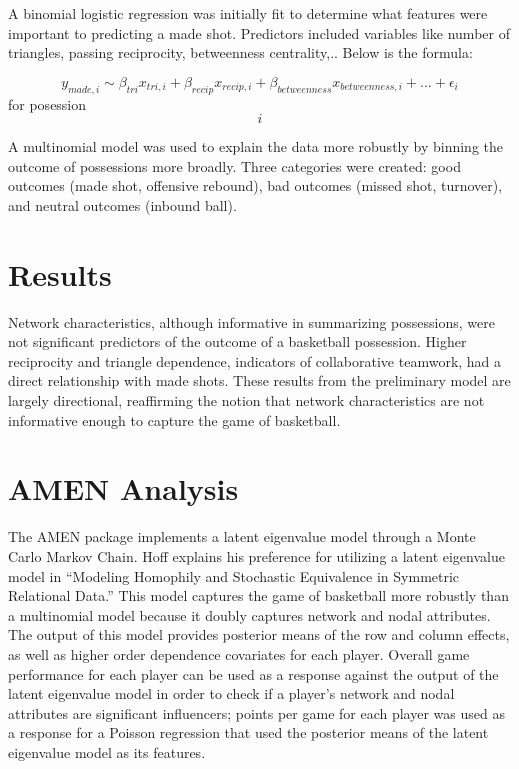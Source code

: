 \documentclass[12pt,twoside]{dukestatscithesis}
\theoremstyle{definition}
\theoremstyle{definition}
\theoremstyle{definition}
\theoremstyle{remark}
\begin{document}
A binomial logistic regression was initially fit to determine what
features were important to predicting a made shot. Predictors included
variables like number of triangles, passing reciprocity, betweenness
centrality,.. Below is the formula:

\[y_{made,i} \sim \beta_{tri}x_{tri,i} + \beta_{recip}x_{recip,i} + \beta_{betweenness}x_{betweenness,i} + ... + \epsilon_{i}\]
for posession \[i\]

A multinomial model was used to explain the data more robustly by
binning the outcome of possessions more broadly. Three categories were
created: good outcomes (made shot, offensive rebound), bad outcomes
(missed shot, turnover), and neutral outcomes (inbound ball).

\section{Results}\label{results}

Network characteristics, although informative in summarizing
possessions, were not significant predictors of the outcome of a
basketball possession. Higher reciprocity and triangle dependence,
indicators of collaborative teamwork, had a direct relationship with
made shots. These results from the preliminary model are largely
directional, reaffirming the notion that network characteristics are not
informative enough to capture the game of basketball.

\section{AMEN Analysis}\label{amen-analysis}

The AMEN package implements a latent eigenvalue model through a Monte
Carlo Markov Chain. Hoff explains his preference for utilizing a latent
eigenvalue model in ``Modeling Homophily and Stochastic Equivalence in
Symmetric Relational Data.'' This model captures the game of basketball
more robustly than a multinomial model because it doubly captures
network and nodal attributes. The output of this model provides
posterior means of the row and column effects, as well as higher order
dependence covariates for each player. Overall game performance for each
player can be used as a response against the output of the latent
eigenvalue model in order to check if a player's network and nodal
attributes are significant influencers; points per game for each player
was used as a response for a Poisson regression that used the posterior
means of the latent eigenvalue model as its features.
\end{document}
